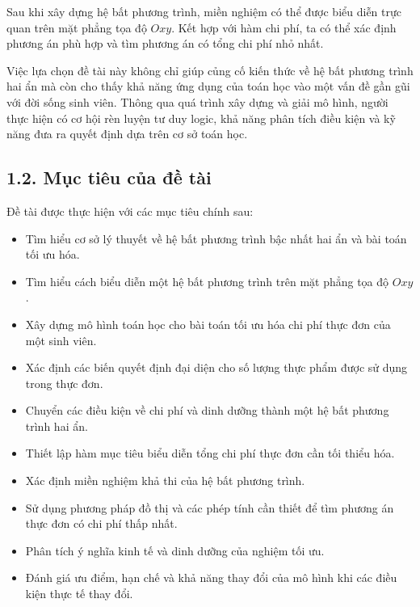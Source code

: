 \documentclass[12pt,a4paper]{article}
\begin{document}
Sau khi xây dựng hệ bất phương trình, miền nghiệm có thể được biểu diễn trực quan trên mặt phẳng tọa độ $Oxy$. Kết hợp với hàm chi phí, ta có thể xác định phương án phù hợp và tìm phương án có tổng chi phí nhỏ nhất.

Việc lựa chọn đề tài này không chỉ giúp củng cố kiến thức về hệ bất phương trình hai ẩn mà còn cho thấy khả năng ứng dụng của toán học vào một vấn đề gần gũi với đời sống sinh viên. Thông qua quá trình xây dựng và giải mô hình, người thực hiện có cơ hội rèn luyện tư duy logic, khả năng phân tích điều kiện và kỹ năng đưa ra quyết định dựa trên cơ sở toán học.



\subsection*{1.2. Mục tiêu của đề tài}

Đề tài được thực hiện với các mục tiêu chính sau:
\begin{itemize}
    \item Tìm hiểu cơ sở lý thuyết về hệ bất phương trình bậc nhất hai ẩn và bài toán tối ưu hóa.
    \item Tìm hiểu cách biểu diễn một hệ bất phương trình trên mặt phẳng tọa độ $Oxy$.
    \item Xây dựng mô hình toán học cho bài toán tối ưu hóa chi phí thực đơn của một sinh viên.
    \item Xác định các biến quyết định đại diện cho số lượng thực phẩm được sử dụng trong thực đơn.
    \item Chuyển các điều kiện về chi phí và dinh dưỡng thành một hệ bất phương trình hai ẩn.
    \item Thiết lập hàm mục tiêu biểu diễn tổng chi phí thực đơn cần tối thiểu hóa.
    \item Xác định miền nghiệm khả thi của hệ bất phương trình.
    \item Sử dụng phương pháp đồ thị và các phép tính cần thiết để tìm phương án thực đơn có chi phí thấp nhất.
    \item Phân tích ý nghĩa kinh tế và dinh dưỡng của nghiệm tối ưu.
    \item Đánh giá ưu điểm, hạn chế và khả năng thay đổi của mô hình khi các điều kiện thực tế thay đổi.
\end{itemize}


\end{document}
